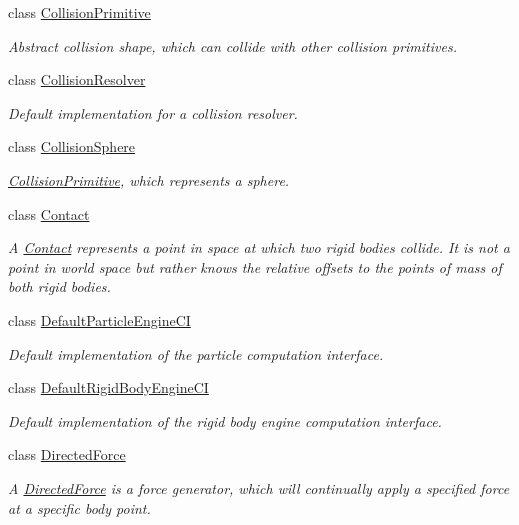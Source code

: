 \begin{DoxyCompactItemize}
class \mbox{\hyperlink{classr3_1_1_collision_primitive}{Collision\+Primitive}}
\begin{DoxyCompactList}\small\item\em Abstract collision shape, which can collide with other collision primitives. \end{DoxyCompactList}\item 
class \mbox{\hyperlink{classr3_1_1_collision_resolver}{Collision\+Resolver}}
\begin{DoxyCompactList}\small\item\em Default implementation for a collision resolver. \end{DoxyCompactList}\item 
class \mbox{\hyperlink{classr3_1_1_collision_sphere}{Collision\+Sphere}}
\begin{DoxyCompactList}\small\item\em \mbox{\hyperlink{classr3_1_1_collision_primitive}{Collision\+Primitive}}, which represents a sphere. \end{DoxyCompactList}\item 
class \mbox{\hyperlink{classr3_1_1_contact}{Contact}}
\begin{DoxyCompactList}\small\item\em A \mbox{\hyperlink{classr3_1_1_contact}{Contact}} represents a point in space at which two rigid bodies collide. It is not a point in world space but rather knows the relative offsets to the points of mass of both rigid bodies. \end{DoxyCompactList}\item 
class \mbox{\hyperlink{classr3_1_1_default_particle_engine_c_i}{Default\+Particle\+Engine\+CI}}
\begin{DoxyCompactList}\small\item\em Default implementation of the particle computation interface. \end{DoxyCompactList}\item 
class \mbox{\hyperlink{classr3_1_1_default_rigid_body_engine_c_i}{Default\+Rigid\+Body\+Engine\+CI}}
\begin{DoxyCompactList}\small\item\em Default implementation of the rigid body engine computation interface. \end{DoxyCompactList}\item 
class \mbox{\hyperlink{classr3_1_1_directed_force}{Directed\+Force}}
\begin{DoxyCompactList}\small\item\em A \mbox{\hyperlink{classr3_1_1_directed_force}{Directed\+Force}} is a force generator, which will continually apply a specified force at a specific body point. \end{DoxyCompactList}\item 

\end{DoxyCompactItemize}

